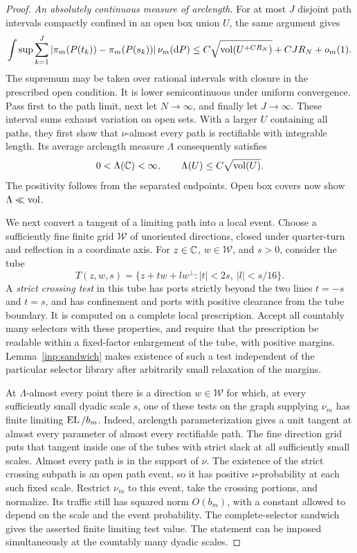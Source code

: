 \begin{proof}
\emph{An absolutely continuous measure of arclength.}
For at most $J$ disjoint path intervals compactly confined in an
open box union $U$, the same argument gives
\begin{equation}\label{nd:variation-bound}
 \int\sup\sum_{k=1}^{J}
       |\pi_m(P(t_k))-\pi_m(P(s_k))|\,\nu_m(\mathrm d P)
 \le C\sqrt{\operatorname{vol}(U^{+CR_N})}+CJR_N+o_m(1).
\end{equation}
The supremum may be taken over rational intervals with closure
in the prescribed open condition.  It is lower semicontinuous
under uniform convergence.  Pass first to the path limit, next
let $N\to\infty$, and finally let $J\to\infty$.  These interval
sums exhaust variation on open sets.  With a larger $U$ containing
all paths, they first show that $\nu$-almost every path is
rectifiable with integrable length.  Its average arclength
measure $\Lambda$ consequently satisfies
\begin{equation}\label{nd:length-area}
 0<\Lambda(\mathbb C)<\infty,
 \qquad \Lambda(U)\le C\sqrt{\operatorname{vol}(U)}.
\end{equation}
The positivity follows from the separated endpoints.  Open box
covers now show $\Lambda\ll\operatorname{vol}$.

We next convert a tangent of a limiting path into a local event.
Choose a sufficiently fine finite grid $\mathcal W$ of unoriented
directions, closed under quarter-turn and reflection in a coordinate
axis.  For $z\in\mathbb C$, $w\in\mathcal W$, and $s>0$, consider the tube
\begin{equation}\label{nd:tube}
 T(z,w,s)=\{z+tw+lw^\perp: |t|<2s,\ |l|<s/16\}.
\end{equation}
A \emph{strict crossing test} in this tube has ports strictly
beyond the two lines $t=-s$ and $t=s$, and has confinement and
ports with positive clearance from the tube boundary.  It is
computed on a complete local prescription.  Accept all countably
many selectors with these properties, and require that the
prescription be readable within a fixed-factor enlargement of
the tube, with positive margins.  Lemma~\ref{inp:sandwich} makes
existence of such a test independent of the particular selector
library after arbitrarily small relaxation of the margins.

At $\Lambda$-almost every point there is a direction $w\in\mathcal W$
for which, at every sufficiently small dyadic scale $s$, one of
these tests on the graph supplying $\nu_m$ has finite limiting
$\operatorname{EL}/b_m$.  Indeed, arclength parameterization gives a unit tangent
at almost every parameter of almost every rectifiable path.  The
fine direction grid puts that tangent inside one of the tubes
with strict slack at all sufficiently small scales.  Almost
every path is in the support of $\nu$.  The existence of the
strict crossing subpath is an open path event, so it has positive
$\nu$-probability at each such fixed scale.  Restrict $\nu_m$ to
this event, take the crossing portions, and normalize.  Its traffic
still has squared norm $O(b_m)$, with a constant allowed to depend
on the scale and the event probability.  The complete-selector
sandwich gives the asserted finite limiting test value.  The
statement can be imposed simultaneously at the countably many
dyadic scales.


\end{proof}
